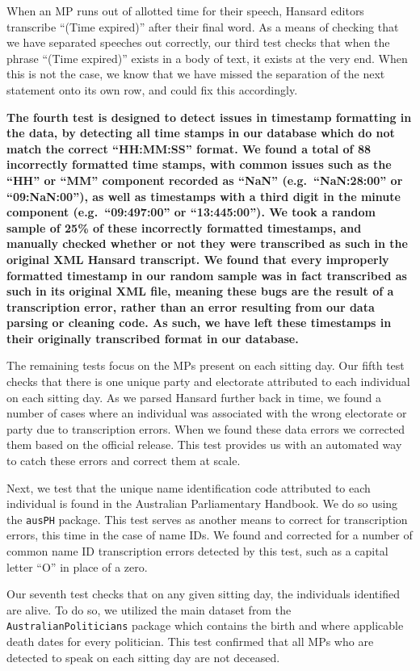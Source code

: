 \documentclass[
  letterpaper,
  DIV=11,
  numbers=noendperiod]{scrartcl}
\begin{document}
When an MP runs out of allotted time for their speech, Hansard editors
transcribe ``(Time expired)'' after their final word. As a means of
checking that we have separated speeches out correctly, our third test
checks that when the phrase ``(Time expired)'' exists in a body of text,
it exists at the very end. When this is not the case, we know that we
have missed the separation of the next statement onto its own row, and
could fix this accordingly.

\textbf{The fourth test is designed to detect issues in timestamp
formatting in the data, by detecting all time stamps in our database
which do not match the correct ``HH:MM:SS'' format. We found a total of
88 incorrectly formatted time stamps, with common issues such as the
``HH'' or ``MM'' component recorded as ``NaN'' (e.g.~``NaN:28:00'' or
``09:NaN:00''), as well as timestamps with a third digit in the minute
component (e.g.~``09:497:00'' or ``13:445:00''). We took a random sample
of 25\% of these incorrectly formatted timestamps, and manually checked
whether or not they were transcribed as such in the original XML Hansard
transcript. We found that every improperly formatted timestamp in our
random sample was in fact transcribed as such in its original XML file,
meaning these bugs are the result of a transcription error, rather than
an error resulting from our data parsing or cleaning code. As such, we
have left these timestamps in their originally transcribed format in our
database.}

The remaining tests focus on the MPs present on each sitting day. Our
fifth test checks that there is one unique party and electorate
attributed to each individual on each sitting day. As we parsed Hansard
further back in time, we found a number of cases where an individual was
associated with the wrong electorate or party due to transcription
errors. When we found these data errors we corrected them based on the
official release. This test provides us with an automated way to catch
these errors and correct them at scale.

Next, we test that the unique name identification code attributed to
each individual is found in the Australian Parliamentary Handbook. We do
so using the \texttt{ausPH} package. This test serves as another means
to correct for transcription errors, this time in the case of name IDs.
We found and corrected for a number of common name ID transcription
errors detected by this test, such as a capital letter ``O'' in place of
a zero.

Our seventh test checks that on any given sitting day, the individuals
identified are alive. To do so, we utilized the main dataset from the
\texttt{AustralianPoliticians} package which contains the birth and
where applicable death dates for every politician. This test confirmed
that all MPs who are detected to speak on each sitting day are not
deceased.
\end{document}
